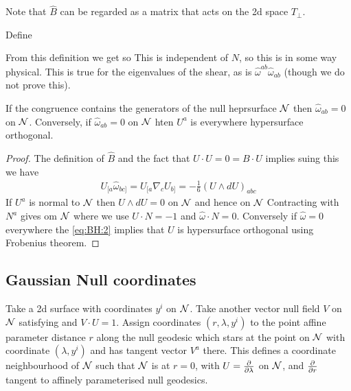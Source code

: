 \documentclass{article}
\begin{document}
Note that $\hat{B}$ can be regarded as a matrix that acts on the 2d space $T_\perp$. 

\begin{definition}
Define 
\end{definition}

From this definition we get 
so 
This is independent of $N$, so this is in some way physical. This is true for the eigenvalues of the shear, as is $\hat{\omega}^{ab} \hat{\omega}_{ab}$ (though we do not prove this). 

\begin{prop}
If the congruence contains the generators of the null heprsurface $\mathcal{N}$ then $\hat{\omega}_{ab} = 0$ on $\mathcal{N}$. Conversely, if $\hat{\omega}_{ab} = 0 $ on $\mathcal{N}$ hten $U^a$ is everywhere hypersurface orthogonal. 
\end{prop}
\begin{proof}
The definition of $\hat{B}$ and the fact that $U \cdot U = 0 = B \cdot U $ implies 
suing this we have 
\begin{align}\label{eq:BH:2}
U_{[a}\hat{\omega}_{bc]} = U_{[a}\nabla_c U_{b]} = -\frac{1}{6} (U \wedge dU)_{abc} 
\end{align}
If $U^a$ is normal to $\mathcal{N}$ then $U \wedge dU = 0$ on $\mathcal{N}$ and hence on $\mathcal{N}$
Contracting with $N^a$ gives 
om $\mathcal{N}$ where we use $U \cdot N = -1$ and $\hat{\omega} \cdot N = 0$. Conversely if $\hat{\omega} = 0$ everywhere the \ref{eq:BH:2} implies that $U$
is hypersurface orthogonal using Frobenius theorem.  
 \end{proof}
 
\subsection{Gaussian Null coordinates}
Take a 2d surface with coordinates $y^i$ on $\mathcal{N}$. Take another vector null field $V$ on $\mathcal{N}$ satisfying 
and $V \cdot U = 1$. Assign coordinates $(r,\lambda,y^i)$ to the point affine parameter distance $r$ along the null geodesic which stars at the point on $\mathcal{N}$ with coordinate $(\lambda,y^i)$ and has tangent vector $V^a$ there. This defines a coordinate neighbourhood of $\mathcal{N}$ such that $\mathcal{N}$ is at $r=0$, with $U = \frac{\partial}{\partial\lambda}$ on $\mathcal{N}$, and $\frac{\partial}{\partial r}$ tangent to affinely parameterised null geodesics. \\
\end{document}
